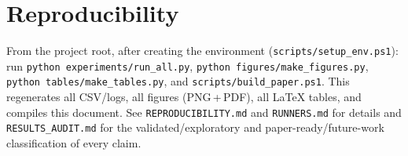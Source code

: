 \documentclass[journal]{IEEEtran}
\newcommand{\code}[1]{\texttt{#1}}
\begin{document}
\section{Reproducibility}\label{app:repro}
From the project root, after creating the environment
(\code{scripts/setup\_env.ps1}): run \code{python experiments/run\_all.py},
\code{python figures/make\_figures.py}, \code{python tables/make\_tables.py}, and
\code{scripts/build\_paper.ps1}. This regenerates all CSV/logs, all figures
(PNG\,+\,PDF), all \LaTeX{} tables, and compiles this document. See
\code{REPRODUCIBILITY.md} and \code{RUNNERS.md} for details and
\code{RESULTS\_AUDIT.md} for the validated/exploratory and
paper-ready/future-work classification of every claim.



\end{document}
